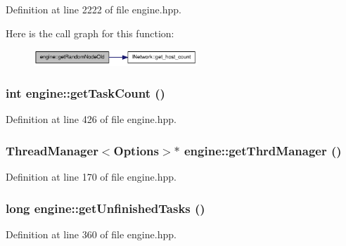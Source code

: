Definition at line 2222 of file engine.hpp.

Here is the call graph for this function:\nopagebreak
\begin{figure}[H]
\begin{center}
\leavevmode
\includegraphics[width=175pt]{classengine_a2156b4ae876cbd9345642b9cd580cf1f_cgraph}
\end{center}
\end{figure}
\hypertarget{classengine_a9897b8efc6acb6c6bcdd888ed4d67c96}{
\subsubsection[{getTaskCount}]{\setlength{\rightskip}{0pt plus 5cm}int engine::getTaskCount ()}}
\label{classengine_a9897b8efc6acb6c6bcdd888ed4d67c96}


Definition at line 426 of file engine.hpp.\hypertarget{classengine_a728694d16eb4a744fe56b39fed8eac85}{
\subsubsection[{getThrdManager}]{\setlength{\rightskip}{0pt plus 5cm}ThreadManager$<${\bf Options}$>$$\ast$ engine::getThrdManager ()}}
\label{classengine_a728694d16eb4a744fe56b39fed8eac85}


Definition at line 170 of file engine.hpp.\hypertarget{classengine_abe97f2997638c312c34128fd581472dd}{
\subsubsection[{getUnfinishedTasks}]{\setlength{\rightskip}{0pt plus 5cm}long engine::getUnfinishedTasks ()}}
\label{classengine_abe97f2997638c312c34128fd581472dd}


Definition at line 360 of file engine.hpp.

